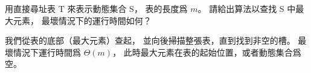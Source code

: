 \startEXERCISE
用直接尋址表 T 來表示動態集合 S，
表的長度爲 $m$。
請給出算法以查找 S 中最大元素，
最壞情況下的運行時間如何？
\stopEXERCISE

\startANSWER
我們從表的底部（最大元素）查起，
並向後掃描整張表，直到找到非空的槽。
最壞情況下運行時間爲 $\Theta(m)$，
此時最大元素在表的起始位置，或者動態集合爲空。
\stopANSWER
